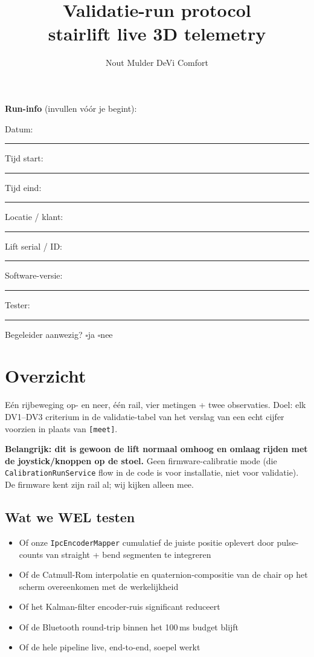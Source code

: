 \documentclass[11pt, a4paper]{article}
\title{\vspace{-1.2cm}\textbf{Validatie-run protocol}\\\large stairlift live 3D telemetry}
\author{Nout Mulder \textbullet{} DeVi Comfort}
\date{}
\newcommand{\cbox}{$\square$\;}
\newcommand{\fillline}{\rule[-0.5ex]{4cm}{0.4pt}}
\newcommand{\fillshort}{\rule[-0.5ex]{2cm}{0.4pt}}
\newcommand{\filllong}{\rule[-0.5ex]{6cm}{0.4pt}}
\begin{document}
\maketitle
\thispagestyle{fancy}
\vspace{-0.7cm}

\begin{fillbox}
\textbf{Run-info} (invullen vóór je begint):

Datum: \fillline\hfill Tijd start: \fillshort\hfill Tijd eind: \fillshort

Locatie / klant: \filllong

Lift serial / ID: \fillline\hfill Software-versie: \fillshort

Tester: \fillline\hfill Begeleider aanwezig? \cbox ja \cbox nee
\end{fillbox}

\section*{Overzicht}

Eén rijbeweging op- en neer, één rail, vier metingen + twee observaties.
Doel: elk DV1--DV3 criterium in de validatie-tabel van het verslag van
een echt cijfer voorzien in plaats van \texttt{[meet]}.

\textbf{Belangrijk: dit is gewoon de lift normaal omhoog en omlaag
rijden met de joystick/knoppen op de stoel.} Geen firmware-calibratie
mode (die \texttt{CalibrationRunService} flow in de code is voor
installatie, niet voor validatie). De firmware kent zijn rail al; wij
kijken alleen mee.

\subsection*{Wat we WEL testen}

\begin{itemize}[leftmargin=2em, label=$\bullet$]
  \item Of onze \texttt{IpcEncoderMapper} cumulatief de juiste positie
        oplevert door pulse-counts van straight + bend segmenten te
        integreren
  \item Of de Catmull-Rom interpolatie en quaternion-compositie van de
        chair op het scherm overeenkomen met de werkelijkheid
  \item Of het Kalman-filter encoder-ruis significant reduceert
  \item Of de Bluetooth round-trip binnen het 100\,ms budget blijft
  \item Of de hele pipeline live, end-to-end, soepel werkt
\end{itemize}
\end{document}
